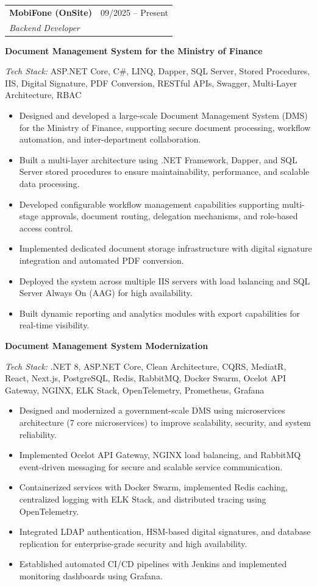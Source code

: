 \documentclass[a4paper,10pt]{article}
\makeatletter
\newcommand{\cventry}[4]{%
    \noindent
    \begin{tabularx}{\linewidth}{@{}X r@{}}
        \textbf{\color{darktext}#1} & \textcolor{lighttext}{\small #2} \\
        \textit{\color{primary}#3} & \\
    \end{tabularx}
    \vspace{-0.3em}
    #4
    \vspace{0.5em}
}
\newcommand{\projectentry}[2]{%
    \noindent
    \textbf{\color{darktext}#1}
    \vspace{-0.3em}
    #2
    \vspace{0.5em}
}
\newcommand{\techstack}[1]{%
    \vspace{-0.3em}
    \noindent\textcolor{lighttext}{\small\textit{Tech Stack:} #1}
    \vspace{0.2em}
}
\makeatother
\begin{document}
\cventry{MobiFone (OnSite)}{09/2025 -- Present}{Backend Developer}{

    \projectentry{Document Management System for the Ministry of Finance}{
        \techstack{ASP.NET Core, C\#, LINQ, Dapper, SQL Server, Stored Procedures, IIS, Digital Signature, PDF Conversion, RESTful APIs, Swagger, Multi-Layer Architecture, RBAC}

        \begin{itemize}[leftmargin=1.2em, itemsep=0.1em, topsep=0.2em]
            \item Designed and developed a large-scale Document Management System (DMS) for the Ministry of Finance, supporting secure document processing, workflow automation, and inter-department collaboration.
            \item Built a multi-layer architecture using .NET Framework, Dapper, and SQL Server stored procedures to ensure maintainability, performance, and scalable data processing.
            \item Developed configurable workflow management capabilities supporting multi-stage approvals, document routing, delegation mechanisms, and role-based access control.
            \item Implemented dedicated document storage infrastructure with digital signature integration and automated PDF conversion.
            \item Deployed the system across multiple IIS servers with load balancing and SQL Server Always On (AAG) for high availability.
            \item Built dynamic reporting and analytics modules with export capabilities for real-time visibility.
        \end{itemize}
    }

    \projectentry{Document Management System Modernization}{
        \techstack{.NET 8, ASP.NET Core, Clean Architecture, CQRS, MediatR, React, Next.js, PostgreSQL, Redis, RabbitMQ, Docker Swarm, Ocelot API Gateway, NGINX, ELK Stack, OpenTelemetry, Prometheus, Grafana}

        \begin{itemize}[leftmargin=1.2em, itemsep=0.1em, topsep=0.2em]
            \item Designed and modernized a government-scale DMS using microservices architecture (7 core microservices) to improve scalability, security, and system reliability.
            \item Implemented Ocelot API Gateway, NGINX load balancing, and RabbitMQ event-driven messaging for secure and scalable service communication.
            \item Containerized services with Docker Swarm, implemented Redis caching, centralized logging with ELK Stack, and distributed tracing using OpenTelemetry.
            \item Integrated LDAP authentication, HSM-based digital signatures, and database replication for enterprise-grade security and high availability.
            \item Established automated CI/CD pipelines with Jenkins and implemented monitoring dashboards using Grafana.
        \end{itemize}
    }
}
\end{document}
